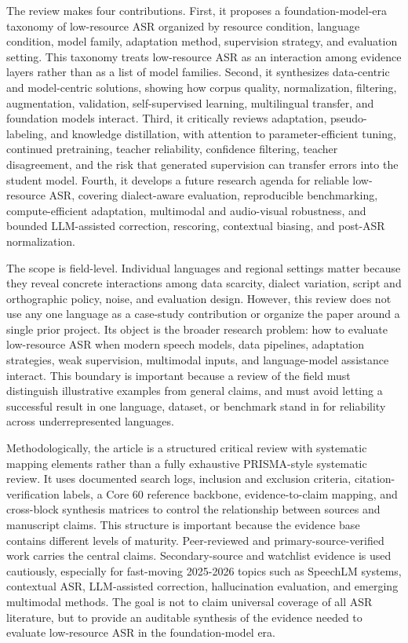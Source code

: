 \documentclass[pdflatex,sn-basic]{sn-jnl}
\theoremstyle{thmstyleone}
\theoremstyle{thmstyletwo}
\theoremstyle{thmstylethree}
\begin{document}
The review makes four contributions. First, it proposes a foundation-model-era taxonomy of low-resource ASR organized by resource condition, language condition, model family, adaptation method, supervision strategy, and evaluation setting. This taxonomy treats low-resource ASR as an interaction among evidence layers rather than as a list of model families. Second, it synthesizes data-centric and model-centric solutions, showing how corpus quality, normalization, filtering, augmentation, validation, self-supervised learning, multilingual transfer, and foundation models interact. Third, it critically reviews adaptation, pseudo-labeling, and knowledge distillation, with attention to parameter-efficient tuning, continued pretraining, teacher reliability, confidence filtering, teacher disagreement, and the risk that generated supervision can transfer errors into the student model. Fourth, it develops a future research agenda for reliable low-resource ASR, covering dialect-aware evaluation, reproducible benchmarking, compute-efficient adaptation, multimodal and audio-visual robustness, and bounded LLM-assisted correction, rescoring, contextual biasing, and post-ASR normalization.

The scope is field-level. Individual languages and regional settings matter because they reveal concrete interactions among data scarcity, dialect variation, script and orthographic policy, noise, and evaluation design. However, this review does not use any one language as a case-study contribution or organize the paper around a single prior project. Its object is the broader research problem: how to evaluate low-resource ASR when modern speech models, data pipelines, adaptation strategies, weak supervision, multimodal inputs, and language-model assistance interact. This boundary is important because a review of the field must distinguish illustrative examples from general claims, and must avoid letting a successful result in one language, dataset, or benchmark stand in for reliability across underrepresented languages.

Methodologically, the article is a structured critical review with systematic mapping elements rather than a fully exhaustive PRISMA-style systematic review. It uses documented search logs, inclusion and exclusion criteria, citation-verification labels, a Core 60 reference backbone, evidence-to-claim mapping, and cross-block synthesis matrices to control the relationship between sources and manuscript claims. This structure is important because the evidence base contains different levels of maturity. Peer-reviewed and primary-source-verified work carries the central claims. Secondary-source and watchlist evidence is used cautiously, especially for fast-moving 2025-2026 topics such as SpeechLM systems, contextual ASR, LLM-assisted correction, hallucination evaluation, and emerging multimodal methods. The goal is not to claim universal coverage of all ASR literature, but to provide an auditable synthesis of the evidence needed to evaluate low-resource ASR in the foundation-model era.
\end{document}
